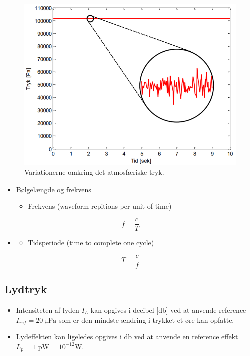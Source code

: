 \begin{figure} [H]
	\centering
	\includegraphics[width=0.85\linewidth]{graphics/44.png}
	\caption{Variationerne omkring det atmosfæriske tryk.}
	\label{fig:44}
\end{figure}

\begin{itemize}
	\item Bølgelængde og frekvens
	\begin{itemize}
		\item Frekvens (waveform repitions per unit of time) 
	\end{itemize}
\end{itemize}
\begin{equation}\label{eq:freq}
f = \frac{c}{T}
\end{equation}
\begin{itemize}
	\item[] 
	\begin{itemize}
		\item Tidsperiode (time to complete one cycle) 
	\end{itemize}
\end{itemize}
\begin{equation}\label{eq:wave}
T = \frac{c}{f}
\end{equation}

\subsection{Lydtryk}
\begin{itemize}
	\item Intensiteten af lyden $I_L$ kan opgives i decibel [\si{\decibel}] ved at anvende reference $I_{ref} = \SI{20}{\micro\pascal}$ som er den mindste ændring i trykket et øre kan opfatte.
	\item Lydeffekten kan ligeledes opgives i \si{\decibel} ved at anvende en reference effekt $L_p = \SI{1}{\pico\watt} = 10^{-12} \si{\watt}$.
\end{itemize}

